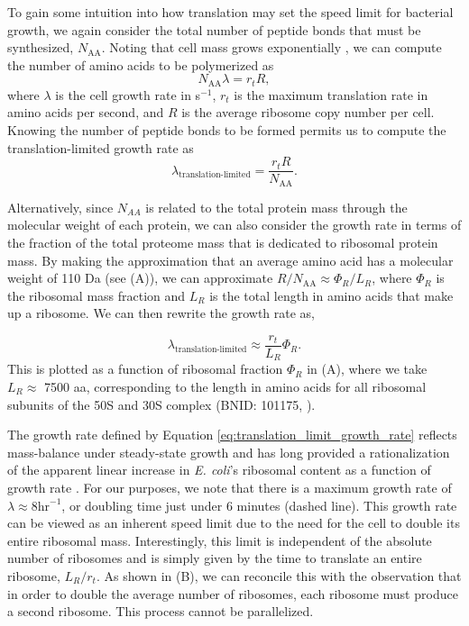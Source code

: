 To gain some intuition into how translation may set the speed limit for
bacterial growth, we again consider the total number of peptide bonds that must
be synthesized, $N_\text{AA}$. Noting that cell mass grows exponentially
\citep{godin2010}, we can compute the number of amino acids to be polymerized as
\begin{equation} N_\text{AA} \lambda = r_t R, \end{equation} where
$\lambda$ is the cell growth rate in s$^{-1}$, $r_t$ is the maximum translation
rate in amino acids per second, and $R$ is the average ribosome copy number per
cell. Knowing the number of peptide bonds to be formed permits us to compute the
translation-limited growth rate as \begin{equation}
\lambda_\text{translation-limited} = \frac{r_t R}{N_\text{AA}}.
\end{equation}

Alternatively, since $N_{AA}$ is related to the total protein mass through the
molecular weight of each protein, we can also consider the growth rate in terms
of the fraction of the total proteome mass that is dedicated to ribosomal
protein mass. By making the approximation that an average amino acid has a
molecular weight of 110 Da (see (A)), we can approximate  $R
/ N_\text{AA} \approx \Phi_R / L_R$,  where $\Phi_R$ is the ribosomal mass
fraction and $L_R$ is the total length in amino acids that make up a ribosome.
We can then rewrite the growth rate as,

\begin{equation}
\lambda_{\textrm{translation-limited}} \approx \frac{r_t}{L_R}  \Phi_R.
\label{eq:translation_limit_growth_rate}
\end{equation}
This is plotted as a function of ribosomal fraction $\Phi_R$ in
(A), where we take $L_R \approx$ 7500 aa, corresponding to
the length in amino acids for all ribosomal subunits of the 50S and 30S complex
(BNID: 101175, \citep{milo2010}).

The growth rate defined by Equation \ref{eq:translation_limit_growth_rate}
reflects mass-balance under steady-state growth and has long provided a
rationalization of the apparent linear increase in \textit{E. coli}'s ribosomal
content as a function of growth rate \citep{Goldberger1979, scott2010}. For our
purposes, we note that there is a maximum growth rate of $\lambda \approx 8
\text{hr}^{-1}$, or doubling time just under 6 minutes (dashed line). This
growth rate can be viewed as an inherent speed limit due to the need for the
cell to double its entire ribosomal mass. Interestingly, this limit is
independent of the absolute number of ribosomes and is simply given by the time
to translate an entire ribosome, $L_R/ r_t$. As shown in
(B), we can reconcile this with the observation that in
order to double the average number of ribosomes, each ribosome must produce a
second ribosome. This process cannot be parallelized.

